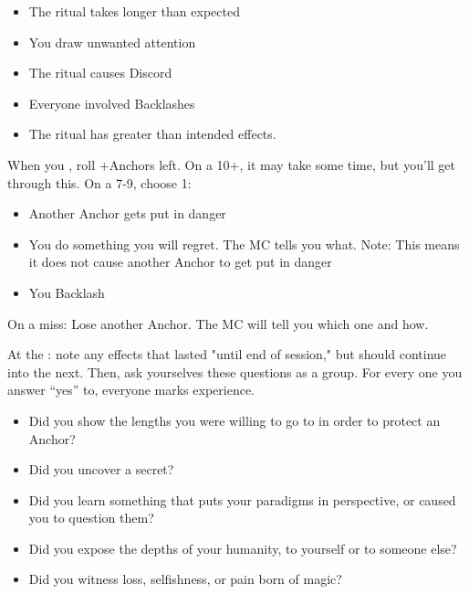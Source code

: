 \begin{multicols}{3}
\begin{move}
    \begin{itemize}
      \setlength\itemsep{0em}
    \item The ritual takes longer than expected
    \item You draw unwanted attention
    \item The ritual causes Discord
    \item Everyone involved Backlashes
    \item The ritual has greater than intended effects.
    \end{itemize}

  \end{move}

  \SEPARATOR

  \begin{move}
    When you , roll +Anchors left. On a 10+, it may take some time, but you’ll get through this. On a 7-9, choose 1:

    \begin{itemize}
      \setlength\itemsep{0em}
    \item Another Anchor gets put in danger
    \item You do something you will regret. The MC tells you what. Note: This means it does not cause another Anchor to get put in danger
    \item You Backlash 
    \end{itemize}
On a miss: Lose another Anchor. The MC will tell you which one and how.

  \end{move}

  \columnbreak

  \begin{move}
    At the : note any effects that lasted "until end of session," but should continue into the next. Then, ask yourselves these questions as a group. For every one you answer “yes” to, everyone marks experience.

    \begin{itemize}
      \setlength\itemsep{0em}
    \item Did you show the lengths you were willing to go to in order to protect an Anchor?
    \item Did you uncover a secret?
    \item Did you learn something that puts your paradigms in perspective, or caused you to question them?
    \item Did you expose the depths of your humanity, to yourself or to someone else?
    \item Did you witness loss, selfishness, or pain born of magic?
    \end{itemize}


\end{move}
\end{multicols}
